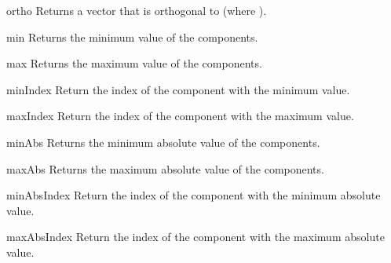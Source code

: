 \begin{methoddesc}{ortho}{}
Returns a vector that is orthogonal to  (where
).
\end{methoddesc}

\begin{methoddesc}{min}{}
Returns the minimum value of the components.
\end{methoddesc}

\begin{methoddesc}{max}{}
Returns the maximum value of the components.
\end{methoddesc}

\begin{methoddesc}{minIndex}{}
Return the index of the component with the minimum value.
\end{methoddesc}

\begin{methoddesc}{maxIndex}{}
Return the index of the component with the maximum value.
\end{methoddesc}

\begin{methoddesc}{minAbs}{}
Returns the minimum absolute value of the components.
\end{methoddesc}

\begin{methoddesc}{maxAbs}{}
Returns the maximum absolute value of the components.
\end{methoddesc}

\begin{methoddesc}{minAbsIndex}{}
Return the index of the component with the minimum absolute value.
\end{methoddesc}

\begin{methoddesc}{maxAbsIndex}{}
Return the index of the component with the maximum absolute value.
\end{methoddesc}
